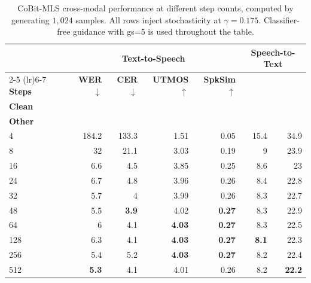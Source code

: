 \begin{table}[t]
\centering
\small
\setlength{\tabcolsep}{4.5pt}
\begin{tabular}{lrrrrrr}
\toprule
& \multicolumn{4}{c}{\textbf{Text-to-Speech}} & \multicolumn{2}{c}{\textbf{Speech-to-Text}} \\
\cmidrule(lr){2-5} \cmidrule(lr){6-7}
\textbf{Steps} & \textbf{WER}$\downarrow$ & \textbf{CER}$\downarrow$ & \textbf{UTMOS}$\uparrow$ & \textbf{SpkSim}$\uparrow$ & \makecell{\textbf{WER}$\downarrow$ \\ \textbf{Clean}} & \makecell{\textbf{WER}$\downarrow$ \\ \textbf{Other}} \\
\midrule
4 & 184.2 & 133.3 & 1.51 & 0.05 & 15.4 & 34.9\\
8 & 32 & 21.1 & 3.03 & 0.19 & 9 & 23.9 \\
16 & 6.6 & 4.5 & 3.85 & 0.25 & 8.6 & 23 \\
24 & 6.7 & 4.8 & 3.96 & 0.26 & 8.4 & 22.8 \\
32 & 5.7 & 4 & 3.99 & 0.26 & 8.3 & 22.7 \\
48 & 5.5 & \textbf{3.9} & 4.02 & \textbf{0.27} & 8.3 & 22.9 \\
64 & 6 & 4.1 & \textbf{4.03} & \textbf{0.27} & 8.3 & 22.5 \\
128 & 6.3 & 4.1 & \textbf{4.03} & \textbf{0.27} & \textbf{8.1} & 22.3 \\
256 & 5.4 & 5.2 & \textbf{4.03} & \textbf{0.27} & 8.2 & 22.4 \\
512 & \textbf{5.3} & 4.1 & 4.01 & 0.26 & 8.2 & \textbf{22.2} \\
\bottomrule
\end{tabular}
\caption{CoBit-MLS cross-modal performance at different step counts, computed by generating $1,024$ samples. All rows inject stochasticity at $\gamma=0.175$. Classifier-free guidance with gs=5 is used throughout the table.}
\label{tab:audio:steps:cross-modal}
\end{table}

